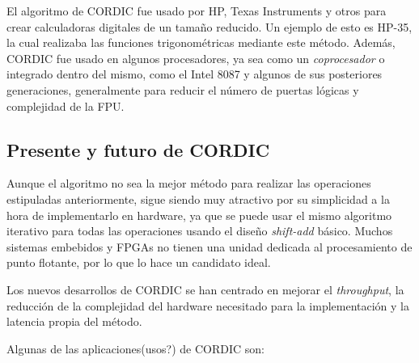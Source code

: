 El algoritmo de CORDIC fue usado por HP, Texas Instruments y otros para crear calculadoras digitales de un tamaño reducido. Un ejemplo de esto es HP-35, la cual realizaba las funciones trigonométricas mediante este método. Además, CORDIC fue usado en algunos procesadores, ya sea como un \textit{coprocesador} o integrado dentro del mismo, como el Intel 8087 y algunos de sus posteriores generaciones, generalmente para reducir el número de puertas lógicas y complejidad de la FPU.


\subsection{Presente y futuro de CORDIC}

Aunque el algoritmo no sea la mejor método para realizar las operaciones estipuladas anteriormente, sigue siendo muy atractivo por su simplicidad a la hora de implementarlo en hardware, ya que se puede usar el mismo algoritmo iterativo para todas las operaciones usando el diseño \textit{shift-add} básico. Muchos sistemas embebidos y FPGAs no tienen una unidad dedicada al procesamiento de punto flotante, por lo que lo hace un candidato ideal. 

Los nuevos desarrollos de CORDIC se han centrado en mejorar el \textit{throughput}, la reducción de la complejidad del hardware necesitado para la implementación y la latencia propia del método.

Algunas de las aplicaciones(usos?) de CORDIC son:


